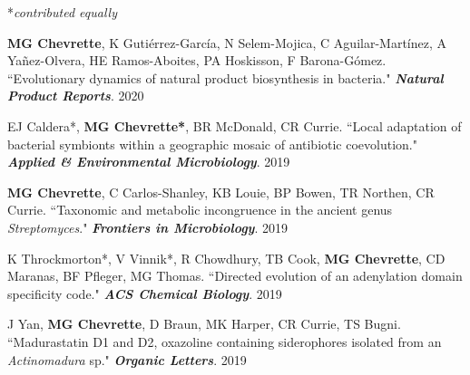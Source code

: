 


\begin{cvpubs}

\cvpub
{\hspace{-1cm} *\textit{contributed equally}} %
{}

\cvpub
{\textbf{MG Chevrette}, K Guti\'{e}rrez-Garc\'{i}a, N Selem-Mojica, C Aguilar-Mart\'{i}nez, A Ya\~{n}ez-Olvera, HE Ramos-Aboites, PA Hoskisson, F Barona-G\'{o}mez. ``Evolutionary dynamics of natural product biosynthesis in bacteria." \textit{\textbf{Natural Product Reports}}. \textbf{\textit{}}}
{2020}

\cvpub
{EJ Caldera*, \textbf{MG Chevrette*}, BR McDonald, CR Currie. ``Local adaptation of bacterial symbionts within a geographic mosaic of antibiotic coevolution." \textit{\textbf{Applied \& Environmental Microbiology}}. \textbf{\textit{}}}
{2019}

\end{cvpubs} \begin{cvpubs}

\cvpub
{\textbf{MG Chevrette}, C Carlos-Shanley, KB Louie, BP Bowen, TR Northen, CR Currie. ``Taxonomic and metabolic incongruence in the ancient genus \textit{Streptomyces}." \textit{\textbf{Frontiers in Microbiology}}. \textbf{\textit{}}}
{2019}

\cvpub
{K Throckmorton*, V Vinnik*, R Chowdhury, TB Cook, \textbf{MG Chevrette}, CD Maranas, BF Pfleger, MG Thomas. ``Directed evolution of an adenylation domain specificity code." \textit{\textbf{ACS Chemical Biology}}. \textbf{\textit{}}}
{2019}

\cvpub
{J Yan, \textbf{MG Chevrette}, D Braun, MK Harper, CR Currie, TS Bugni. ``Madurastatin D1 and D2, oxazoline containing siderophores isolated from an \textit{Actinomadura} sp." \textit{\textbf{Organic Letters}}. \textbf{\textit{}}}
{2019}


\end{cvpubs}
